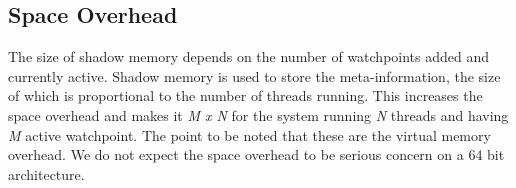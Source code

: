 \subsection{Space Overhead}
The size of shadow memory depends on the number of watchpoints added and currently active. Shadow memory is used to store the meta-information, the size of which is proportional to the number of threads running. This increases the space overhead and makes it \emph{M x N} for the system running \emph{N} threads and having \emph{M} active watchpoint. The point to be noted that these are the virtual memory overhead. We do not expect the space overhead to be serious concern on a 64 bit architecture.    

